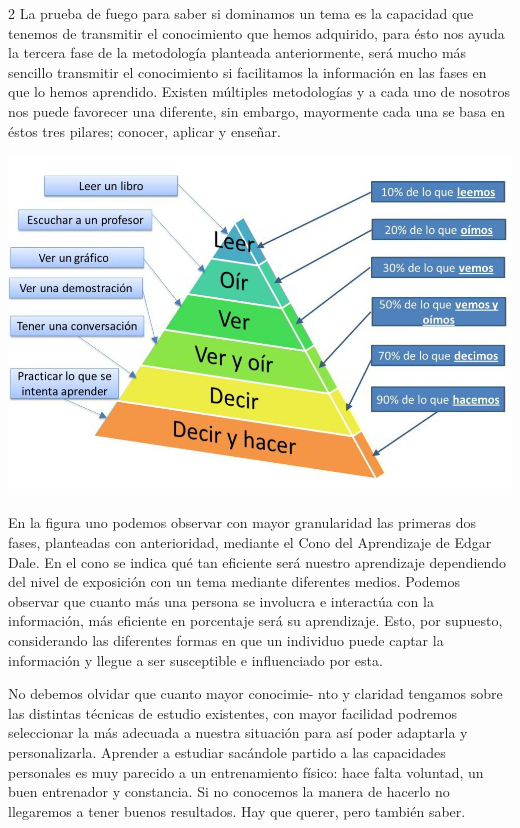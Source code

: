 \documentclass[12pt,spanish,Letterpaper,openany]{book}
\begin{document}
\begin {multicols}{2}
La prueba de fuego para saber si dominamos un tema es la capacidad que tenemos de transmitir el conocimiento que hemos adquirido, para ésto nos ayuda la tercera fase de la metodología planteada anteriormente, será mucho más sencillo transmitir el conocimiento si facilitamos la información en las fases en que lo hemos aprendido. Existen múltiples metodologías y a cada uno de nosotros nos puede favorecer una diferente, sin embargo, mayormente cada una se basa en éstos tres pilares; conocer, aplicar y enseñar.

\begin {flushleft}
\noindent\begin{minipage}[c]{\columnwidth}
\centering

\includegraphics[width=1\linewidth]{images/pareja34_image2}

\end{minipage}
\end {flushleft}

En la figura uno podemos observar con mayor granularidad las primeras dos fases, planteadas con anterioridad, mediante el Cono del Aprendizaje de Edgar Dale. En el cono se indica qué tan eficiente será nuestro aprendizaje dependiendo del nivel de exposición con un tema mediante diferentes medios. Podemos observar que cuanto más una persona se involucra e interactúa con la información, más eficiente en porcentaje será su aprendizaje. Esto, por supuesto, considerando las diferentes formas en que un individuo puede captar la información y llegue a ser susceptible e influenciado por esta.

No debemos olvidar que cuanto mayor conocimie-
nto y claridad tengamos sobre las distintas técnicas de estudio existentes, con mayor facilidad podremos seleccionar la más adecuada a nuestra situación para así poder adaptarla y personalizarla. Aprender a estudiar sacándole partido a las capacidades personales es muy parecido a un entrenamiento físico: hace falta voluntad, un buen entrenador y constancia. Si no conocemos la manera de hacerlo no llegaremos a tener buenos resultados. Hay que querer, pero también saber.


\end{multicols}
\end{document}
